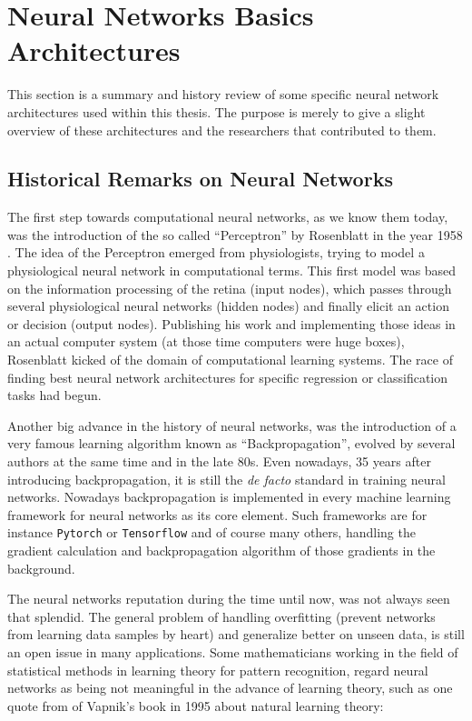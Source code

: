 
\section{Neural Networks Basics Architectures}\label{sec:prev_nn}
\thesisStateNotReady
This section is a summary and history review of some specific neural network architectures used within this thesis.
The purpose is merely to give a slight overview of these architectures and the researchers that contributed to them.


\subsection{Historical Remarks on Neural Networks}\label{sec:prev_nn_history}
The first step towards computational neural networks, as we know them today, was the introduction of the so called \enquote{Perceptron} by Rosenblatt in the year 1958 \cite{Rosenblatt1958}. 
The idea of the Perceptron emerged from physiologists, trying to model a physiological neural network in computational terms. 
This first model was based on the information processing of the retina (input nodes), which passes through several physiological neural networks (hidden nodes) and finally elicit an action or decision (output nodes).
Publishing his work and implementing those ideas in an actual computer system (at those time computers were huge boxes), Rosenblatt kicked of the domain of computational learning systems.
The race of finding best neural network architectures for specific regression or classification tasks had begun.

Another big advance in the history of neural networks, was the introduction of a very famous learning algorithm known as \enquote{Backpropagation}, evolved by several authors at the same time \cite{LeCun1986} and \cite{Rumelhart1986} in the late 80s. 
Even nowadays, 35 years after introducing backpropagation, it is still the \emph{de facto} standard in training neural networks.
Nowadays backpropagation is implemented in every machine learning framework for neural networks as its core element.
Such frameworks are for instance \texttt{Pytorch} or \texttt{Tensorflow} and of course many others, handling the gradient calculation and backpropagation algorithm of those gradients in the background.

The neural networks reputation during the time until now, was not always seen that splendid.
The general problem of handling overfitting (prevent networks from learning data samples by heart) and generalize better on unseen data, is still an open issue in many applications.
Some mathematicians working in the field of statistical methods in learning theory for pattern recognition, regard neural networks as being not meaningful in the advance of learning theory, such as one quote from \cite{Vapnik1995} of Vapnik's book in 1995 about natural learning theory:

